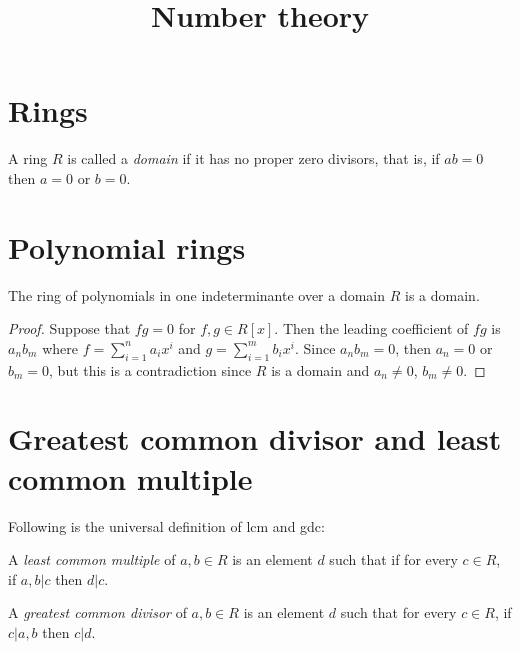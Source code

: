 



\title{Number theory}
\maketitle

\label{section-phantom}

\tableofcontents

\section{Rings}
\label{section-rings}

\begin{definition}
\label{definition-domain}
A ring $R$ is called a {\it domain} if it has
no proper zero divisors,
that is, if $ab=0$ then $a=0$ or $b=0$.
\end{definition}

\section{Polynomial rings}
\label{section-polynomial-rings}

\begin{lemma}
\label{lemma-ring-polyn-one-indet-over}
The ring of polynomials in one indeterminante
over
a domain $R$ is a domain.
\end{lemma}

\begin{proof}
Suppose that $fg=0$ for $f,g \in R[x]$. Then
the leading coefficient of $fg$ is $a_nb_m$
where $f=\sum_{i=1}^n a_ix^i$ and
$g=\sum_{i=1}^mb_ix^i$.
Since $a_nb_m=0$, then $a_n=0$ or $b_m=0$,
but this is a contradiction since $R$ is a
domain and $a_n \neq 0$, $b_m \neq 0$.
\end{proof}

\section{Greatest common divisor and least
common multiple}
\label{section-gcd-and-lcm}

Following is the universal definition of lcm
and gdc:

\begin{definition}
\label{definition-lcm-and-gdc-universal}
A {\it least common multiple} of $a,b \in R$
is an element $d$ such that if for
every $c\in R$, if $a,b|c$ then $d|c$.

A {\it greatest common divisor} of $a,b \in
R$ is an element $d$ such that
for every  $c \in R$,  if $c|a,b$ then
$c|d$.
\end{definition}

